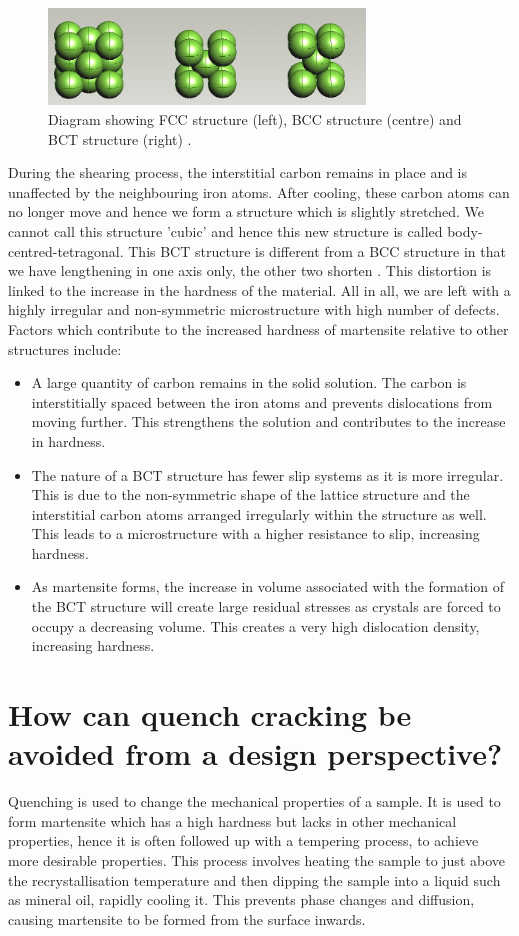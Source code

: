 \documentclass[11pt]{article}
\begin{document}
\begin{figure}[H]
    \centering
    \includegraphics[width = 0.75\textwidth]{./img/q3a.jpg}
    \caption{Diagram showing FCC structure (left), BCC structure (centre) and BCT structure (right) \cite{b3}.}
\end{figure}
During the shearing process, the interstitial carbon remains in place and is unaffected by the neighbouring iron atoms. After cooling, these carbon atoms can no longer move and hence we form a structure which is slightly stretched. We cannot call this structure 'cubic' and hence this new structure is called body-centred-tetragonal. This BCT structure is different from a BCC structure in that we have lengthening in one axis only, the other two shorten \cite{b2}. This distortion is linked to the increase in the hardness of the material. All in all, we are left with a highly irregular and non-symmetric microstructure with high number of defects. Factors which contribute to the increased hardness of martensite relative to other structures include:
\begin{itemize}
    \item A large quantity of carbon remains in the solid solution. The carbon is interstitially spaced between the iron atoms and prevents dislocations from moving further. This strengthens the solution and contributes to the increase in hardness.
    \item The nature of a BCT structure has fewer slip systems as it is more irregular. This is due to the non-symmetric shape of the lattice structure and the interstitial carbon atoms arranged irregularly within the structure as well. This leads to a microstructure with a higher resistance to slip, increasing hardness.
    \item As martensite forms, the increase in volume associated with the formation of the BCT structure will create large residual stresses as crystals are forced to occupy a decreasing volume. This creates a very high dislocation density, increasing hardness.
\end{itemize}
\section{How can quench cracking be avoided from a design perspective?}
Quenching is used to change the mechanical properties of a sample. It is used to form martensite which has a high hardness but lacks in other mechanical properties, hence it is often followed up with a tempering process, to achieve more desirable properties. This process involves heating the sample to just above the recrystallisation temperature and then dipping the sample into a liquid such as mineral oil, rapidly cooling it. This prevents phase changes and diffusion, causing martensite to be formed from the surface inwards. 
\end{document}
